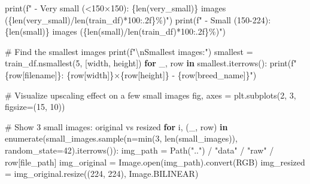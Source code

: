 \documentclass[
  letterpaper,
  DIV=11,
  numbers=noendperiod]{scrartcl}
\newenvironment{Shaded}{\begin{snugshade}}{\end{snugshade}}
\newcommand{\BuiltInTok}[1]{\textcolor[rgb]{0.00,0.23,0.31}{#1}}
\newcommand{\CharTok}[1]{\textcolor[rgb]{0.13,0.47,0.30}{#1}}
\newcommand{\CommentTok}[1]{\textcolor[rgb]{0.37,0.37,0.37}{#1}}
\newcommand{\ControlFlowTok}[1]{\textcolor[rgb]{0.00,0.23,0.31}{\textbf{#1}}}
\newcommand{\DecValTok}[1]{\textcolor[rgb]{0.68,0.00,0.00}{#1}}
\newcommand{\KeywordTok}[1]{\textcolor[rgb]{0.00,0.23,0.31}{\textbf{#1}}}
\newcommand{\NormalTok}[1]{\textcolor[rgb]{0.00,0.23,0.31}{#1}}
\newcommand{\OperatorTok}[1]{\textcolor[rgb]{0.37,0.37,0.37}{#1}}
\newcommand{\SpecialCharTok}[1]{\textcolor[rgb]{0.37,0.37,0.37}{#1}}
\newcommand{\SpecialStringTok}[1]{\textcolor[rgb]{0.13,0.47,0.30}{#1}}
\newcommand{\StringTok}[1]{\textcolor[rgb]{0.13,0.47,0.30}{#1}}
\renewenvironment{Shaded}{%
  \begin{tcolorbox}[%
    enhanced,%
    colback=codebg,%
    colframe=codebg,%
    borderline west={3pt}{0pt}{sectionblue},%
    boxrule=0pt,%
    arc=0pt,%
    boxsep=5pt,%
    left=2mm,%
    right=2mm,%
    top=2mm,%
    bottom=2mm%
  ]%
}{%
  \end{tcolorbox}%
}
\begin{document}
\begin{Shaded}
\begin{Highlighting}[]
\BuiltInTok{print}\NormalTok{(}\SpecialStringTok{f"  {-} Very small (\textless{}150×150): }\SpecialCharTok{\{}\BuiltInTok{len}\NormalTok{(very\_small)}\SpecialCharTok{\}}\SpecialStringTok{ images (}\SpecialCharTok{\{}\BuiltInTok{len}\NormalTok{(very\_small)}\OperatorTok{/}\BuiltInTok{len}\NormalTok{(train\_df)}\OperatorTok{*}\DecValTok{100}\SpecialCharTok{:.2f\}}\SpecialStringTok{\%)"}\NormalTok{)}
\BuiltInTok{print}\NormalTok{(}\SpecialStringTok{f"  {-} Small (150{-}224): }\SpecialCharTok{\{}\BuiltInTok{len}\NormalTok{(small)}\SpecialCharTok{\}}\SpecialStringTok{ images (}\SpecialCharTok{\{}\BuiltInTok{len}\NormalTok{(small)}\OperatorTok{/}\BuiltInTok{len}\NormalTok{(train\_df)}\OperatorTok{*}\DecValTok{100}\SpecialCharTok{:.2f\}}\SpecialStringTok{\%)"}\NormalTok{)}

\CommentTok{\# Find the smallest images}
\BuiltInTok{print}\NormalTok{(}\SpecialStringTok{f"}\CharTok{\textbackslash{}n}\SpecialStringTok{Smallest images:"}\NormalTok{)}
\NormalTok{smallest }\OperatorTok{=}\NormalTok{ train\_df.nsmallest(}\DecValTok{5}\NormalTok{, [}\StringTok{\textquotesingle{}width\textquotesingle{}}\NormalTok{, }\StringTok{\textquotesingle{}height\textquotesingle{}}\NormalTok{])}
\ControlFlowTok{for}\NormalTok{ \_, row }\KeywordTok{in}\NormalTok{ smallest.iterrows():}
    \BuiltInTok{print}\NormalTok{(}\SpecialStringTok{f"  }\SpecialCharTok{\{}\NormalTok{row[}\StringTok{\textquotesingle{}filename\textquotesingle{}}\NormalTok{]}\SpecialCharTok{\}}\SpecialStringTok{: }\SpecialCharTok{\{}\NormalTok{row[}\StringTok{\textquotesingle{}width\textquotesingle{}}\NormalTok{]}\SpecialCharTok{\}}\SpecialStringTok{×}\SpecialCharTok{\{}\NormalTok{row[}\StringTok{\textquotesingle{}height\textquotesingle{}}\NormalTok{]}\SpecialCharTok{\}}\SpecialStringTok{ {-} }\SpecialCharTok{\{}\NormalTok{row[}\StringTok{\textquotesingle{}breed\_name\textquotesingle{}}\NormalTok{]}\SpecialCharTok{\}}\SpecialStringTok{"}\NormalTok{)}

\CommentTok{\# Visualize upscaling effect on a few small images}
\NormalTok{fig, axes }\OperatorTok{=}\NormalTok{ plt.subplots(}\DecValTok{2}\NormalTok{, }\DecValTok{3}\NormalTok{, figsize}\OperatorTok{=}\NormalTok{(}\DecValTok{15}\NormalTok{, }\DecValTok{10}\NormalTok{))}

\CommentTok{\# Show 3 small images: original vs resized}
\ControlFlowTok{for}\NormalTok{ i, (\_, row) }\KeywordTok{in} \BuiltInTok{enumerate}\NormalTok{(small\_images.sample(n}\OperatorTok{=}\BuiltInTok{min}\NormalTok{(}\DecValTok{3}\NormalTok{, }\BuiltInTok{len}\NormalTok{(small\_images)), random\_state}\OperatorTok{=}\DecValTok{42}\NormalTok{).iterrows()):}
\NormalTok{    img\_path }\OperatorTok{=}\NormalTok{ Path(}\StringTok{".."}\NormalTok{) }\OperatorTok{/} \StringTok{"data"} \OperatorTok{/} \StringTok{"raw"} \OperatorTok{/}\NormalTok{ row[}\StringTok{\textquotesingle{}file\_path\textquotesingle{}}\NormalTok{]}
\NormalTok{    img\_original }\OperatorTok{=}\NormalTok{ Image.}\BuiltInTok{open}\NormalTok{(img\_path).convert(}\StringTok{\textquotesingle{}RGB\textquotesingle{}}\NormalTok{)}
\NormalTok{    img\_resized }\OperatorTok{=}\NormalTok{ img\_original.resize((}\DecValTok{224}\NormalTok{, }\DecValTok{224}\NormalTok{), Image.BILINEAR)}
    

\end{Highlighting}
\end{Shaded}
\end{document}
